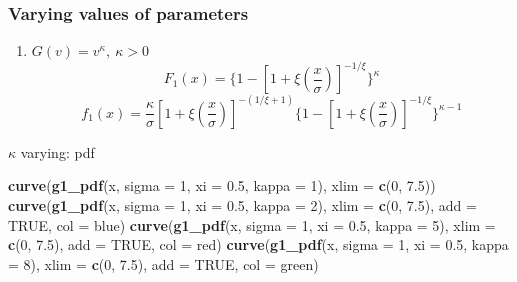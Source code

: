 \documentclass[
]{article}
\author{}
\date{\vspace{-2.5em}}
\newenvironment{Shaded}{\begin{snugshade}}{\end{snugshade}}
\newcommand{\AttributeTok}[1]{\textcolor[rgb]{0.13,0.29,0.53}{#1}}
\newcommand{\ConstantTok}[1]{\textcolor[rgb]{0.56,0.35,0.01}{#1}}
\newcommand{\DecValTok}[1]{\textcolor[rgb]{0.00,0.00,0.81}{#1}}
\newcommand{\FloatTok}[1]{\textcolor[rgb]{0.00,0.00,0.81}{#1}}
\newcommand{\FunctionTok}[1]{\textcolor[rgb]{0.13,0.29,0.53}{\textbf{#1}}}
\newcommand{\NormalTok}[1]{#1}
\newcommand{\StringTok}[1]{\textcolor[rgb]{0.31,0.60,0.02}{#1}}
\providecommand{\tightlist}{%
  \setlength{\itemsep}{0pt}\setlength{\parskip}{0pt}}
\begin{document}
\hypertarget{varying-values-of-parameters}{%
\subsubsection{Varying values of
parameters}\label{varying-values-of-parameters}}

\begin{enumerate}
\def\labelenumi{\arabic{enumi}.}
\tightlist
\item
  \(G(v) = v^\kappa, \ \kappa > 0\)
  \[F_1(x) = \{1 - [1 + \xi(\frac{x}{\sigma})]^{-1/\xi} \}^\kappa\]
  \[f_1(x) = \frac{\kappa}{\sigma}[1 + \xi (\frac{x}{\sigma})]^{-(1/\xi + 1)}\{1 - [1+\xi(\frac{x}{\sigma})]^{-1/\xi} \} ^{\kappa-1}\]
\end{enumerate}

\(\kappa\) varying: pdf

\begin{Shaded}
\begin{Highlighting}[]
\FunctionTok{curve}\NormalTok{(}\FunctionTok{g1\_pdf}\NormalTok{(x, }\AttributeTok{sigma =} \DecValTok{1}\NormalTok{, }\AttributeTok{xi =} \FloatTok{0.5}\NormalTok{, }\AttributeTok{kappa =} \DecValTok{1}\NormalTok{), }\AttributeTok{xlim =} \FunctionTok{c}\NormalTok{(}\DecValTok{0}\NormalTok{, }\FloatTok{7.5}\NormalTok{))}
\FunctionTok{curve}\NormalTok{(}\FunctionTok{g1\_pdf}\NormalTok{(x, }\AttributeTok{sigma =} \DecValTok{1}\NormalTok{, }\AttributeTok{xi =} \FloatTok{0.5}\NormalTok{, }\AttributeTok{kappa =} \DecValTok{2}\NormalTok{), }\AttributeTok{xlim =} \FunctionTok{c}\NormalTok{(}\DecValTok{0}\NormalTok{, }\FloatTok{7.5}\NormalTok{), }\AttributeTok{add =} \ConstantTok{TRUE}\NormalTok{, }\AttributeTok{col =} \StringTok{\textquotesingle{}blue\textquotesingle{}}\NormalTok{)}
\FunctionTok{curve}\NormalTok{(}\FunctionTok{g1\_pdf}\NormalTok{(x, }\AttributeTok{sigma =} \DecValTok{1}\NormalTok{, }\AttributeTok{xi =} \FloatTok{0.5}\NormalTok{, }\AttributeTok{kappa =} \DecValTok{5}\NormalTok{), }\AttributeTok{xlim =} \FunctionTok{c}\NormalTok{(}\DecValTok{0}\NormalTok{, }\FloatTok{7.5}\NormalTok{), }\AttributeTok{add =} \ConstantTok{TRUE}\NormalTok{, }\AttributeTok{col =} \StringTok{\textquotesingle{}red\textquotesingle{}}\NormalTok{)}
\FunctionTok{curve}\NormalTok{(}\FunctionTok{g1\_pdf}\NormalTok{(x, }\AttributeTok{sigma =} \DecValTok{1}\NormalTok{, }\AttributeTok{xi =} \FloatTok{0.5}\NormalTok{, }\AttributeTok{kappa =} \DecValTok{8}\NormalTok{), }\AttributeTok{xlim =} \FunctionTok{c}\NormalTok{(}\DecValTok{0}\NormalTok{, }\FloatTok{7.5}\NormalTok{), }\AttributeTok{add =} \ConstantTok{TRUE}\NormalTok{, }\AttributeTok{col =} \StringTok{\textquotesingle{}green\textquotesingle{}}\NormalTok{)}
\end{Highlighting}
\end{Shaded}
\end{document}
